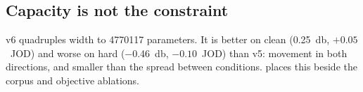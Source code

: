 \subsection{Capacity is not the constraint}
\label{sec:capacity}

v6 quadruples width to \num{4770117} parameters. It is better on clean
(\SI{+0.25}{\decibel}, $+0.05$~JOD) and worse on hard (\SI{-0.46}{\decibel},
$-0.10$~JOD) than v5: movement in both directions, and smaller than the spread
between conditions.  places this beside the corpus and
objective ablations.
